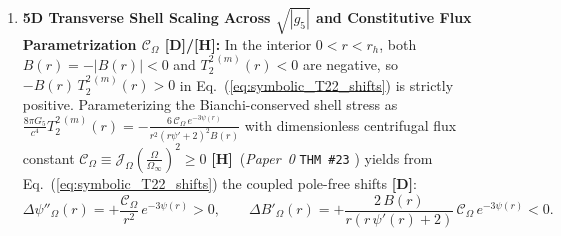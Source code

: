 \documentclass[11pt,a4paper]{article}
\newcommand{\catD}{\textbf{\textcolor{blue!75!black}{[D]}}}
\newcommand{\catH}{\textbf{\textcolor{orange!85!black}{[H]}}}
\theoremstyle{plain}
\theoremstyle{definition}
\theoremstyle{remark}
\numberwithin{equation}{section}
\begin{document}
\begin{enumerate}
\begin{equation}
    \end{equation}
    Simultaneously, by the 5D contracted Bianchi identity $\nabla_A G^A_r \equiv 0 \implies \nabla_A T^{A\,(m)}_r = -\psi'(r)\,T^{2\,(m)}_2(r) - \frac{2}{r}T^{\theta\,(m)}_{\theta}(r) = 0$, the comoving spherical shell $\Sigma_2$ must carry the tangential hoop tension $T^{\theta\,(m)}_{\theta}(r) = -\frac{1}{2}r\,\psi'(r)\,T^{2\,(m)}_2(r)$, guaranteeing that \textbf{all four mixed 5D Einstein equations $E^1_1 = E^2_2 = E^r_r = E^{\theta}_{\theta} = 0$ hold simultaneously and identically} (proved symbolically in Checks~\texttt{\#039}--\texttt{\#040}) \catD.
    \item \textbf{5D Transverse Shell Scaling Across $\sqrt{|g_5|}$ and Constitutive Flux Parametrization $\mathcal{C}_{\Omega}$ \catD/\catH:} In the interior $0 < r < r_h$, both $B(r) = -|B(r)| < 0$ and $T^{2\,(m)}_2(r) < 0$ are negative, so $-B(r)\,T^{2\,(m)}_2(r) > 0$ in Eq.~(\ref{eq:symbolic_T22_shifts}) is strictly positive. Parameterizing the Bianchi-conserved shell stress as $\frac{8\pi G_5}{c^4}T^{2\,(m)}_2(r) = -\frac{6\,\mathcal{C}_{\Omega}\,e^{-3\psi(r)}}{r^2(r\psi'+2)^2 B(r)}$ with dimensionless centrifugal flux constant $\mathcal{C}_{\Omega} \equiv \mathcal{J}_{\Omega}\left(\frac{\Omega}{\Omega_{\infty}}\right)^2 \ge 0$ \catH\ (\textit{Paper~0} \texttt{THM~\#23} \cite{jimenez2026_p0}) yields from Eq.~(\ref{eq:symbolic_T22_shifts}) the coupled pole-free shifts \catD:
    \begin{equation}
      \Delta\psi''_{\Omega}(r) = +\frac{\mathcal{C}_{\Omega}}{r^2}\,e^{-3\psi(r)} > 0, \qquad \Delta B'_{\Omega}(r) = +\frac{2\,B(r)}{r\left(r\,\psi'(r) + 2\right)}\,\mathcal{C}_{\Omega}\,e^{-3\psi(r)} < 0.
      \label{eq:deductive_beta_int_2}
    \end{equation}
\end{enumerate}
\end{document}

